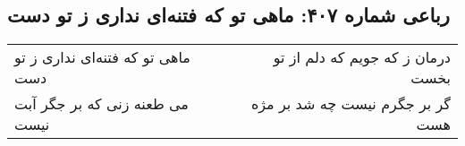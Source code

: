 \begin{center}
\section*{رباعی شماره ۴۰۷: ماهی تو که فتنه‌ای نداری ز تو دست}
\label{sec:0407}
\begin{longtable}{l p{0.5cm} r}
ماهی تو که فتنه‌ای نداری ز تو دست
&&
درمان ز که جویم که دلم از تو بخست
\\
می طعنه زنی که بر جگر آبت نیست
&&
گر بر جگرم نیست چه شد بر مژه هست
\\
\end{longtable}
\end{center}
